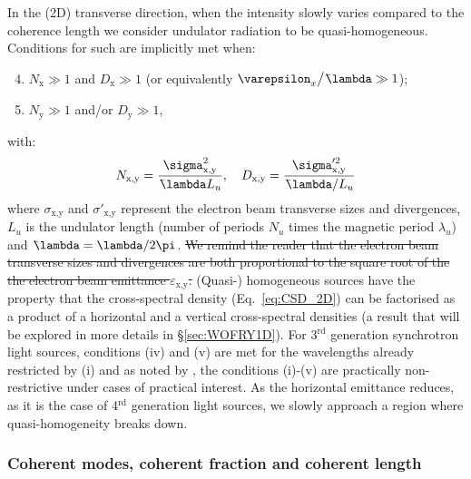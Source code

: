 \documentclass{iucr}              %
\newcommand{\remove}[1]{ {\color{blue} \sout{#1}}}
\newcommand{\lambdabar}{{\mkern0.75mu\mathchar '26\mkern -8.2mu\lambda}}
\begin{document}
In the (2D) transverse direction, when the intensity slowly varies compared to the coherence length we consider undulator radiation to be quasi-homogeneous. Conditions for such are implicitly met when: 
\begin{enumerate}[label=(\roman*)]
\setcounter{enumi}{3}
\item $N_\text{x}\gg1$ and $D_\text{x}\gg1$ (or equivalently $\varepsilon_x\big/\lambdabar\gg1$);
\item $N_\text{y}\gg1$ and/or $D_\text{y}\gg1$,
\end{enumerate}
with:
\begin{equation}
    N_\text{x,y}=\frac{\sigma^2_\text{x,y}}{\lambdabar L_u}, \quad D_\text{x,y}=\frac{\sigma'^2_\text{x,y}}{\lambdabar/L_u}
\end{equation}
where $\sigma_\text{x,y}$ and $\sigma'_\text{x,y}$ represent the electron beam transverse sizes and divergences, $L_u$ is the undulator length (number of periods $N_u$ times the magnetic period $\lambda_u$) and $\lambdabar=\lambda/2\pi$. \remove{We remind the reader that the electron beam transverse sizes and divergences are both proportional to the square root of the the electron beam emittance $\varepsilon_\text{x,y}$.} (Quasi-) homogeneous sources have the property that the cross-spectral density (Eq.~\ref{eq:CSD_2D}) can be factorised as a product of a horizontal and a vertical cross-spectral densities (a result that will be explored in more details in \S\ref{sec:WOFRY1D}). For 3$^{\text{rd}}$ generation synchrotron light sources, conditions (iv) and (v) are met for the wavelengths already restricted by (i) and as noted by , the conditions (i)-(v) are practically non-restrictive under cases of practical interest. As the horizontal emittance reduces, as it is the case of 4$^{\text{rd}}$ generation light sources, we slowly approach a region where quasi-homogeneity breaks down.

\subsubsection{Coherent modes, coherent fraction and coherent length\\}
\end{document}
